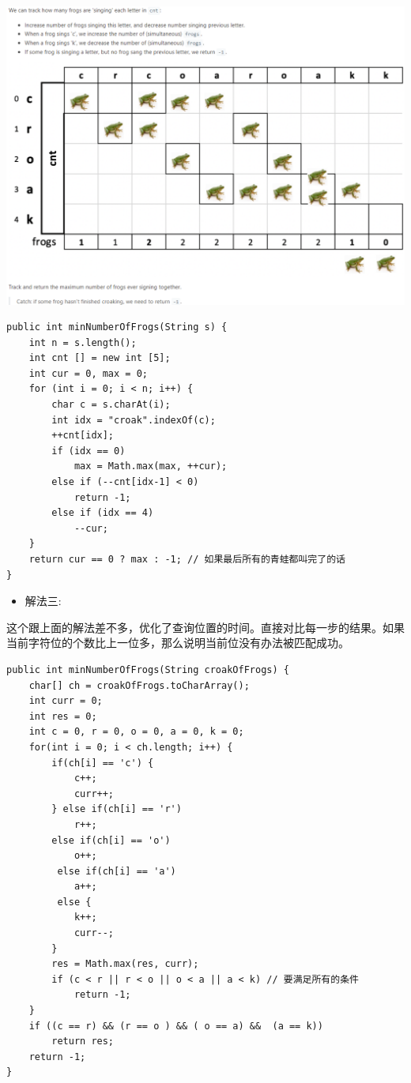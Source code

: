 \documentclass[9pt, b5paaper]{book}
\begin{document}
\includegraphics[width=.9\linewidth]{./pic/frogs.png}
\begin{verbatim}
public int minNumberOfFrogs(String s) {
    int n = s.length();
    int cnt [] = new int [5];
    int cur = 0, max = 0;
    for (int i = 0; i < n; i++) {
        char c = s.charAt(i);
        int idx = "croak".indexOf(c);
        ++cnt[idx];
        if (idx == 0)
            max = Math.max(max, ++cur);
        else if (--cnt[idx-1] < 0)
            return -1;
        else if (idx == 4)
            --cur;
    }
    return cur == 0 ? max : -1; // 如果最后所有的青蛙都叫完了的话  
}
\end{verbatim}
\begin{itemize}
\item 解法三:
\end{itemize}

这个跟上面的解法差不多，优化了查询位置的时间。直接对比每一步的结果。如果当前字符位的个数比上一位多，那么说明当前位没有办法被匹配成功。

\begin{verbatim}
public int minNumberOfFrogs(String croakOfFrogs) {
    char[] ch = croakOfFrogs.toCharArray();
    int curr = 0;
    int res = 0;
    int c = 0, r = 0, o = 0, a = 0, k = 0;
    for(int i = 0; i < ch.length; i++) {
        if(ch[i] == 'c') {
            c++;
            curr++;
        } else if(ch[i] == 'r') 
            r++;
        else if(ch[i] == 'o') 
            o++;
         else if(ch[i] == 'a') 
            a++;
         else {
            k++; 
            curr--;
        }
        res = Math.max(res, curr);
        if (c < r || r < o || o < a || a < k) // 要满足所有的条件
            return -1;
    }
    if ((c == r) && (r == o ) && ( o == a) &&  (a == k)) 
        return res;
    return -1;
}
\end{verbatim}
\end{document}
